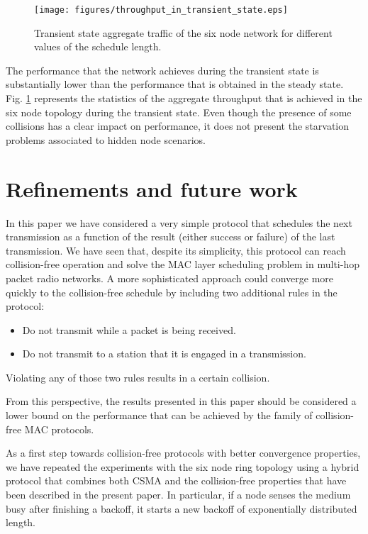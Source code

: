 \documentclass[twocolumn]{svjour3}          \smartqed  \usepackage{graphicx}
\begin{document}
\begin{figure}
\centering
  \texttt{[image: figures/throughput\_in\_transient\_state.eps]}
\caption{Transient state aggregate traffic of the six node network for different values of the schedule length.}
\label{fig:throughput_in_transient_state}
\end{figure}

The performance that the network achieves during the transient state is substantially lower than the performance that is obtained in the steady state.
Fig. \ref{fig:throughput_in_transient_state} represents the statistics of the aggregate throughput that is achieved in the six node topology during the transient state.
Even though the presence of some collisions has a clear impact on performance, it does not present the starvation problems associated to hidden node scenarios.

\section{Refinements and future work}
\label{sec:refinements}

In this paper we have considered a very simple protocol that schedules the next transmission as a function of the result (either success or failure) of the last transmission.
We have seen that, despite its simplicity, this protocol can reach collision-free operation and solve the MAC layer scheduling problem in multi-hop packet radio networks.
A more sophisticated approach could converge more quickly to the collision-free schedule by including two additional rules in the protocol:
\begin{itemize}
\item Do not transmit while a packet is being received.
\item Do not transmit to a station that it is engaged in a transmission.
\end{itemize}
Violating any of those two rules results in a certain collision.

From this perspective, the results presented in this paper should be considered a lower bound on the performance that can be achieved by the family of collision-free MAC protocols.

As a first step towards collision-free protocols with better convergence properties, we have repeated the experiments with the six node ring topology using a hybrid protocol that combines both CSMA and the collision-free properties that have been described in the present paper.
In particular, if a node senses the medium busy after finishing a backoff, it starts a new backoff of exponentially distributed length.
\end{document}
